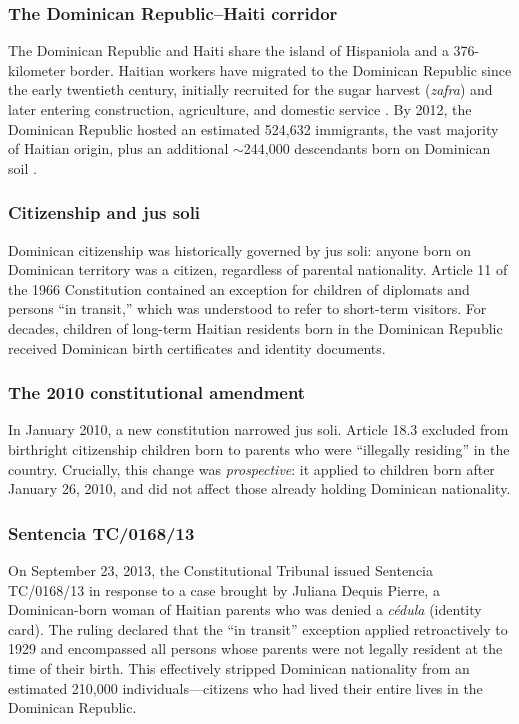 \documentclass[12pt]{article}
\begin{document}
\subsubsection*{The Dominican Republic--Haiti corridor}
The Dominican Republic and Haiti share the island of Hispaniola and a 376-kilometer border. Haitian workers have migrated to the Dominican Republic since the early twentieth century, initially recruited for the sugar harvest (\textit{zafra}) and later entering construction, agriculture, and domestic service \citep{martinez2014peripheral}. By 2012, the Dominican Republic hosted an estimated 524,632 immigrants, the vast majority of Haitian origin, plus an additional $\sim$244,000 descendants born on Dominican soil \citep{one2013eni}.

\subsubsection*{Citizenship and jus soli}
Dominican citizenship was historically governed by jus soli: anyone born on Dominican territory was a citizen, regardless of parental nationality. Article 11 of the 1966 Constitution contained an exception for children of diplomats and persons ``in transit,'' which was understood to refer to short-term visitors. For decades, children of long-term Haitian residents born in the Dominican Republic received Dominican birth certificates and identity documents.

\subsubsection*{The 2010 constitutional amendment}
In January 2010, a new constitution narrowed jus soli. Article 18.3 excluded from birthright citizenship children born to parents who were ``illegally residing'' in the country. Crucially, this change was \textit{prospective}: it applied to children born after January 26, 2010, and did not affect those already holding Dominican nationality.

\subsubsection*{Sentencia TC/0168/13}
On September 23, 2013, the Constitutional Tribunal issued Sentencia TC/0168/13 in response to a case brought by Juliana Dequis Pierre, a Dominican-born woman of Haitian parents who was denied a \textit{c\'{e}dula} (identity card). The ruling declared that the ``in transit'' exception applied retroactively to 1929 and encompassed all persons whose parents were not legally resident at the time of their birth. This effectively stripped Dominican nationality from an estimated 210,000 individuals---citizens who had lived their entire lives in the Dominican Republic.
\end{document}
